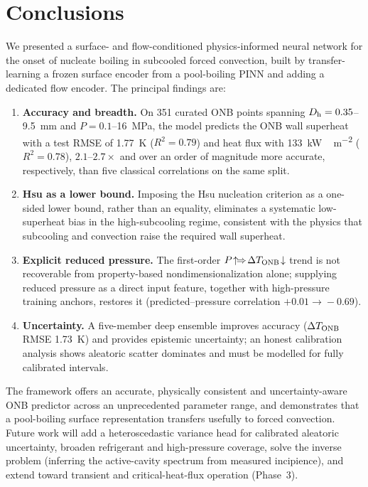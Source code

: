 \section{Conclusions}
\label{sec:conclusions}

We presented a surface- and flow-conditioned physics-informed neural network
for the onset of nucleate boiling in subcooled forced convection, built by
transfer-learning a frozen surface encoder from a pool-boiling PINN and adding a
dedicated flow encoder. The principal findings are:

\begin{enumerate}
\item \textbf{Accuracy and breadth.} On 351 curated ONB points spanning
$D_{\mathrm{h}}=0.35$--\SI{9.5}{mm} and $P=0.1$--\SI{16}{MPa}, the model predicts the ONB
wall superheat with a test RMSE of \SI{1.77}{K} ($R^2=0.79$) and heat flux with
\SI{133}{kW\,m^{-2}} ($R^2=0.78$), $2.1$--$2.7\times$ and over an order of
magnitude more accurate, respectively, than five classical correlations on the
same split.

\item \textbf{Hsu as a lower bound.} Imposing the Hsu nucleation criterion as a
one-sided lower bound, rather than an equality, eliminates a systematic
low-superheat bias in the high-subcooling regime, consistent with the physics
that subcooling and convection raise the required wall superheat.

\item \textbf{Explicit reduced pressure.} The first-order
$P\!\uparrow\!\Rightarrow\!\Delta T_{\mathrm{ONB}}\!\downarrow$ trend is not recoverable from
property-based nondimensionalization alone; supplying reduced pressure as a
direct input feature, together with high-pressure training anchors, restores it
(predicted--pressure correlation $+0.01\!\to\!-0.69$).

\item \textbf{Uncertainty.} A five-member deep ensemble improves accuracy
($\Delta T_{\mathrm{ONB}}$ RMSE \SI{1.73}{K}) and provides epistemic uncertainty; an honest
calibration analysis shows aleatoric scatter dominates and must be modelled for
fully calibrated intervals.
\end{enumerate}

The framework offers an accurate, physically consistent and uncertainty-aware
ONB predictor across an unprecedented parameter range, and demonstrates that a
pool-boiling surface representation transfers usefully to forced convection.
Future work will add a heteroscedastic variance head for calibrated aleatoric
uncertainty, broaden refrigerant and high-pressure coverage, solve the inverse
problem (inferring the active-cavity spectrum from measured incipience), and
extend toward transient and critical-heat-flux operation (Phase~3).
